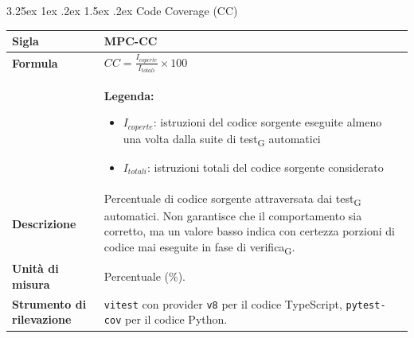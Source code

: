 \documentclass[a4paper, 10pt]{article}
\makeatletter
\renewcommand\paragraph{\@startsection{paragraph}{4}{\z@}%
  {3.25ex \@plus1ex \@minus .2ex}%
  {1.5ex \@plus .2ex}%
  {\normalfont\normalsize\bfseries}}
\makeatother
\begin{document}
\paragraph{Code Coverage (CC)}
\mbox{} \\
\noindent
\begin{minipage}{\textwidth}
    \begin{tabularx}{\textwidth}{|>{\columncolor{bluBitless!10}\bfseries}p{3.5cm}|X|}
        \hline
        Sigla & MPC-CC \\ \hline
        Formula &
        \textit{$CC = \frac{I_{coperte}}{I_{totali}} \times 100$} \vspace{2mm} \\
        & \small \textbf{Legenda:}
        \begin{itemize}
            \item $I_{coperte}$: istruzioni del codice sorgente eseguite almeno una volta dalla suite di test\textsubscript{G} automatici
            \item $I_{totali}$: istruzioni totali del codice sorgente considerato
        \end{itemize} \\ \hline
        Descrizione & Percentuale di codice sorgente attraversata dai test\textsubscript{G} automatici. Non garantisce che il comportamento sia corretto, ma un valore basso indica con certezza porzioni di codice mai eseguite in fase di verifica\textsubscript{G}. \\ \hline
        Unità di misura & Percentuale (\%). \\ \hline
        Strumento di rilevazione & \texttt{vitest} con provider \texttt{v8} per il codice TypeScript, \texttt{pytest-cov} per il codice Python. \\ \hline
    \end{tabularx}
\end{minipage}

\vspace{1cm}

\end{document}
